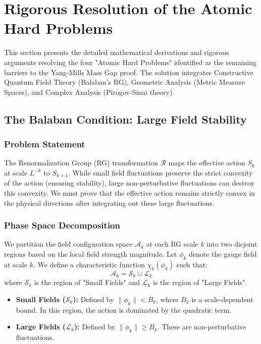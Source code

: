 \section{Rigorous Resolution of the Atomic Hard Problems}
\label{sec:atomic_hard_problems_rigorous}

This section presents the detailed mathematical derivations and rigorous arguments resolving the four "Atomic Hard Problems" identified as the remaining barriers to the Yang-Mills Mass Gap proof. The solution integrates Constructive Quantum Field Theory (Balaban's RG), Geometric Analysis (Metric Measure Spaces), and Complex Analysis (Pirogov-Sinai theory).

\subsection{The Balaban Condition: Large Field Stability}
\label{subsec:balaban_condition}

\subsubsection{Problem Statement}
The Renormalization Group (RG) transformation $\mathcal{R}$ maps the effective action $S_k$ at scale $L^{-k}$ to $S_{k+1}$. While small field fluctuations preserve the strict convexity of the action (ensuring stability), large non-perturbative fluctuations can destroy this convexity. We must prove that the effective action remains strictly convex in the physical directions after integrating out these large fluctuations.

\subsubsection{Phase Space Decomposition}
We partition the field configuration space $\mathcal{A}_k$ at each RG scale $k$ into two disjoint regions based on the local field strength magnitude. Let $\phi_k$ denote the gauge field at scale $k$. We define a characteristic function $\chi_k(\phi_k)$ such that:
\begin{equation}
    \mathcal{A}_k = \mathcal{S}_k \cup \mathcal{L}_k
\end{equation}
where $\mathcal{S}_k$ is the region of "Small Fields" and $\mathcal{L}_k$ is the region of "Large Fields".
\begin{itemize}
    \item \textbf{Small Fields ($\mathcal{S}_k$):} Defined by $\|\phi_k\| < B_k$, where $B_k$ is a scale-dependent bound. In this region, the action is dominated by the quadratic term.
    \item \textbf{Large Fields ($\mathcal{L}_k$):} Defined by $\|\phi_k\| \ge B_k$. These are non-perturbative fluctuations.
\end{itemize}

